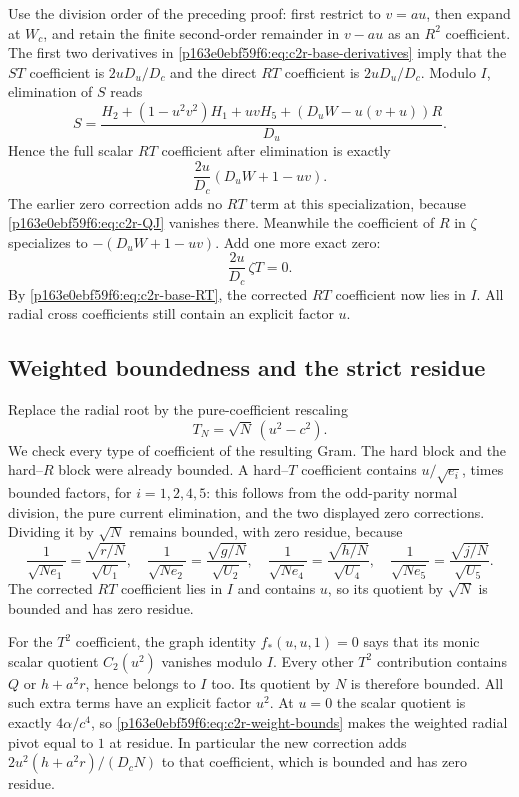 Use the division order of the preceding proof: first restrict to $v=au$,
then expand at $W_c$, and retain the finite second-order remainder in
$v-au$ as an $R^2$ coefficient.  The first two derivatives in
\eqref{p163e0ebf59f6:eq:c2r-base-derivatives} imply that the $ST$ coefficient is
$2uD_u/D_c$ and the direct $RT$ coefficient is $2uD_u/D_c$.
Modulo $I$, elimination of $S$ reads
\[
S=\frac{H_2+(1-u^2v^2)H_1+uvH_5
 +(D_uW-u(v+u))R}{D_u}.
\]
Hence the full scalar $RT$ coefficient after elimination is exactly
\begin{equation}
\frac{2u}{D_c}(D_uW+1-uv).
\label{p163e0ebf59f6:eq:c2r-base-RT}
\end{equation}
The earlier zero correction adds no $RT$ term at this specialization,
because \eqref{p163e0ebf59f6:eq:c2r-QJ} vanishes there.  Meanwhile the coefficient of
$R$ in $\zeta$ specializes to $-(D_uW+1-uv)$.  Add one more exact zero:
\begin{equation}
\frac{2u}{D_c}\,\zeta T=0.
\label{p163e0ebf59f6:eq:c2r-final-correction}
\end{equation}
By \eqref{p163e0ebf59f6:eq:c2r-base-RT}, the corrected $RT$ coefficient now lies in
$I$.  All radial cross coefficients still contain an explicit factor $u$.

\subsection{Weighted boundedness and the strict residue}
Replace the radial root by the pure-coefficient rescaling
\[
T_N=\sqrt N\,(u^2-c^2).
\]
We check every type of coefficient of the resulting Gram.  The hard
block and the hard--$R$ block were already bounded.  A hard--$T$
coefficient contains $u/\sqrt{e_i}$, times bounded factors, for
$i=1,2,4,5$: this follows from the odd-parity normal division, the pure
current elimination, and the two displayed zero corrections.  Dividing
it by $\sqrt N$ remains bounded, with zero residue, because
\[
\frac1{\sqrt{Ne_1}}=\frac{\sqrt{r/N}}{\sqrt{U_1}},\quad
\frac1{\sqrt{Ne_2}}=\frac{\sqrt{g/N}}{\sqrt{U_2}},\quad
\frac1{\sqrt{Ne_4}}=\frac{\sqrt{h/N}}{\sqrt{U_4}},\quad
\frac1{\sqrt{Ne_5}}=\frac{\sqrt{j/N}}{\sqrt{U_5}}.
\]
The corrected $RT$ coefficient lies in $I$ and contains $u$, so its
quotient by $\sqrt N$ is bounded and has zero residue.

For the $T^2$ coefficient, the graph identity $f_*(u,u,1)=0$ says that
its monic scalar quotient $C_2(u^2)$ vanishes modulo $I$.  Every other
$T^2$ contribution contains $Q$ or $h+a^2r$, hence belongs to $I$ too.
Its quotient by $N$ is therefore bounded.  All such extra terms have
an explicit factor $u^2$.  At $u=0$ the scalar quotient is exactly
$4\alpha/c^4$, so \eqref{p163e0ebf59f6:eq:c2r-weight-bounds} makes the weighted radial
pivot equal to $1$ at residue.  In particular the new correction adds
$2u^2(h+a^2r)/(D_cN)$ to that coefficient, which is bounded and has
zero residue.

